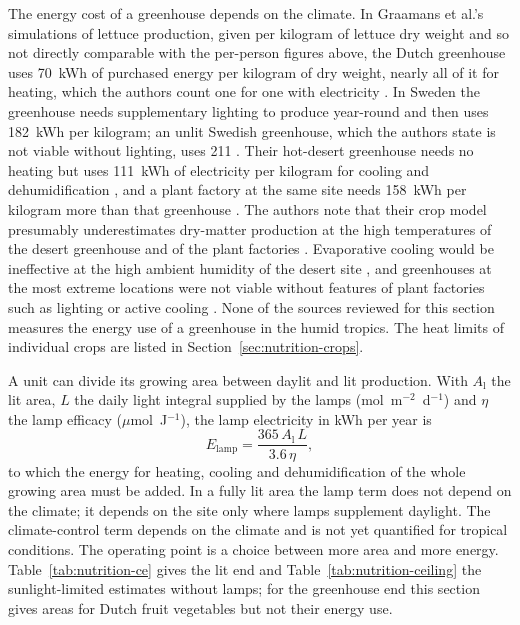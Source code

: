 The energy cost of a greenhouse depends on the climate. In Graamans et al.'s simulations of lettuce production, given per kilogram of lettuce dry weight and so not directly comparable with the per-person figures above, the Dutch greenhouse uses 70~kWh of purchased energy per kilogram of dry weight, nearly all of it for heating, which the authors count one for one with electricity \cite[Abstract, p.~31; Section~2.4.2, p.~35; Fig.~5, p.~38]{graamans2018plant}. In Sweden the greenhouse needs supplementary lighting to produce year-round and then uses 182~kWh per kilogram; an unlit Swedish greenhouse, which the authors state is not viable without lighting, uses 211 \cite[Abstract, p.~31; Section~2.3.3, p.~34; Section~5, p.~39]{graamans2018plant}. Their hot-desert greenhouse needs no heating but uses 111~kWh of electricity per kilogram for cooling and dehumidification \cite[Abstract, p.~31; Fig.~5, p.~38]{graamans2018plant}, and a plant factory at the same site needs 158~kWh per kilogram more than that greenhouse \cite[Section~4.1, p.~37]{graamans2018plant}. The authors note that their crop model presumably underestimates dry-matter production at the high temperatures of the desert greenhouse and of the plant factories \cite[Section~4.3, p.~38]{graamans2018plant}. Evaporative cooling would be ineffective at the high ambient humidity of the desert site \cite[Section~2.3.3, p.~34]{graamans2018plant}, and greenhouses at the most extreme locations were not viable without features of plant factories such as lighting or active cooling \cite[Section~5, p.~39]{graamans2018plant}. None of the sources reviewed for this section measures the energy use of a greenhouse in the humid tropics. The heat limits of individual crops are listed in Section~\ref{sec:nutrition-crops}.

A unit can divide its growing area between daylit and lit production. With $A_{\mathrm{l}}$ the lit area, $L$ the daily light integral supplied by the lamps (mol~m$^{-2}$~d$^{-1}$) and $\eta$ the lamp efficacy ($\mu$mol~J$^{-1}$), the lamp electricity in kWh per year is
\begin{equation}
E_{\mathrm{lamp}} = \frac{365\,A_{\mathrm{l}}\,L}{3.6\,\eta},
\end{equation}
to which the energy for heating, cooling and dehumidification of the whole growing area must be added. In a fully lit area the lamp term does not depend on the climate; it depends on the site only where lamps supplement daylight. The climate-control term depends on the climate and is not yet quantified for tropical conditions. The operating point is a choice between more area and more energy. Table~\ref{tab:nutrition-ce} gives the lit end and Table~\ref{tab:nutrition-ceiling} the sunlight-limited estimates without lamps; for the greenhouse end this section gives areas for Dutch fruit vegetables but not their energy use.

